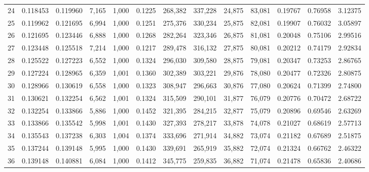 \begin{tabular}{rrrrrrrrrrrrr}
24  &  0.118453 &  0.119960 &   7,165 &  1,000 &                                     0.1225 &  268,382 &  337,228 &   24,875 &   83,081 &  0.19767 &  0.76958 &  3.12375 \\
25  &  0.119962 &  0.121695 &   6,994 &  1,000 &                                     0.1251 &  275,376 &  330,234 &   25,875 &   82,081 &  0.19907 &  0.76032 &  3.05897 \\
26  &  0.121695 &  0.123446 &   6,888 &  1,000 &                                     0.1268 &  282,264 &  323,346 &   26,875 &   81,081 &  0.20048 &  0.75106 &  2.99516 \\
27  &  0.123448 &  0.125518 &   7,214 &  1,000 &                                     0.1217 &  289,478 &  316,132 &   27,875 &   80,081 &  0.20212 &  0.74179 &  2.92834 \\
28  &  0.125522 &  0.127223 &   6,552 &  1,000 &                                     0.1324 &  296,030 &  309,580 &   28,875 &   79,081 &  0.20347 &  0.73253 &  2.86765 \\
29  &  0.127224 &  0.128965 &   6,359 &  1,001 &                                     0.1360 &  302,389 &  303,221 &   29,876 &   78,080 &  0.20477 &  0.72326 &  2.80875 \\
30  &  0.128966 &  0.130619 &   6,558 &  1,000 &                                     0.1323 &  308,947 &  296,663 &   30,876 &   77,080 &  0.20624 &  0.71399 &  2.74800 \\
31  &  0.130621 &  0.132254 &   6,562 &  1,001 &                                     0.1324 &  315,509 &  290,101 &   31,877 &   76,079 &  0.20776 &  0.70472 &  2.68722 \\
32  &  0.132254 &  0.133866 &   5,886 &  1,000 &                                     0.1452 &  321,395 &  284,215 &   32,877 &   75,079 &  0.20896 &  0.69546 &  2.63269 \\
33  &  0.133866 &  0.135542 &   5,998 &  1,001 &                                     0.1430 &  327,393 &  278,217 &   33,878 &   74,078 &  0.21027 &  0.68619 &  2.57713 \\
34  &  0.135543 &  0.137238 &   6,303 &  1,004 &                                     0.1374 &  333,696 &  271,914 &   34,882 &   73,074 &  0.21182 &  0.67689 &  2.51875 \\
35  &  0.137244 &  0.139148 &   5,995 &  1,000 &                                     0.1430 &  339,691 &  265,919 &   35,882 &   72,074 &  0.21324 &  0.66762 &  2.46322 \\
36  &  0.139148 &  0.140881 &   6,084 &  1,000 &                                     0.1412 &  345,775 &  259,835 &   36,882 &   71,074 &  0.21478 &  0.65836 &  2.40686 \\

\end{tabular}
